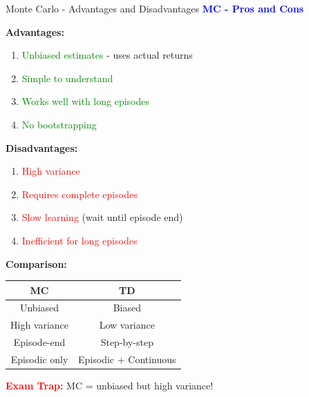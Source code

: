 \documentclass[8pt]{beamer}
\begin{document}
	\begin{frame}{Monte Carlo - Advantages and Disadvantages}
		\fontsize{6.5}{7.5}\selectfont
		\textcolor{blue}{\textbf{MC - Pros and Cons}}
		
		\textbf{Advantages:}
		\begin{enumerate}
			\item \textcolor{green}{Unbiased estimates} - uses actual returns
			\item \textcolor{green}{Simple to understand}
			\item \textcolor{green}{Works well with long episodes}
			\item \textcolor{green}{No bootstrapping}
		\end{enumerate}
		
		\textbf{Disadvantages:}
		\begin{enumerate}
			\item \textcolor{red}{High variance}
			\item \textcolor{red}{Requires complete episodes}
			\item \textcolor{red}{Slow learning} (wait until episode end)
			\item \textcolor{red}{Inefficient for long episodes}
		\end{enumerate}
		
		\textbf{Comparison:}
		\begin{tabular}{|c|c|}
			\hline
			MC & TD \\
			\hline
			Unbiased & Biased \\
			\hline
			High variance & Low variance \\
			\hline
			Episode-end & Step-by-step \\
			\hline
			Episodic only & Episodic + Continuous \\
			\hline
		\end{tabular}
		
		\textcolor{red}{\textbf{Exam Trap:}} MC = unbiased but high variance!
	\end{frame}
	
\end{document}
